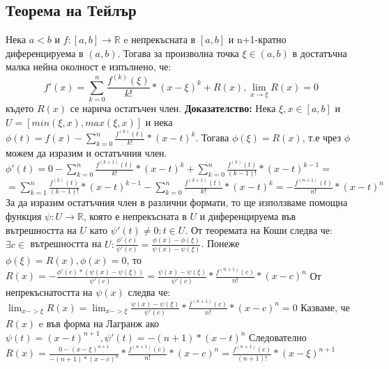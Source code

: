 \documentclass[fleqn,12pt]{article}
\begin{document}
\begin{flushleft}
\subsection{Теорема на Тейлър}
Нека $a<b$ и $f:[a,b]\rightarrow\mathbb{R}$ e непрекъсната в $[a,b]$ и n+1-кратно диференцируема в $(a,b)$. Тогава за произволна точка $\xi \in (a,b)$ в достатъчна малка нейна околност е изпълнено, че:
\[f'(x)=\sum_{k = 0}^{n} \frac{f^{(k)}(\xi)}{k!}*(x-\xi)^k + R(x), \lim_{x \rightarrow \xi} R(x) = 0\]
където $R(x)$ се нарича остатъчен член.
\bigbreak
\textbf{Доказателство:}
Нека $\xi,x \in [a,b]$ и $U=[min(\xi,x),max(\xi,x)]$ и нека $\phi(t) = f(x) - \sum_{k = 0}^{n} \frac{f^{(k)}(t)}{k!}*(x-t)^{k}$.
Тогава $\phi(\xi)=R(x)$, т.е чрез $\phi$ можем да изразим и остатъчния член.
\bigbreak
$\phi'(t)=0 - \sum_{k=0}^{n} \frac{f^{(k+1)}(t)}{k!}*(x-t)^{k} +  \sum_{k=0}^{n}\frac{f^{(k)}(t)}{(k-1)!}*(x-t)^{k-1} =$
$=\sum_{k=1}^{n}\frac{f^{(k)}(t)}{(k-1)!}*(x-t)^{k-1} - \sum_{k=0}^{n} \frac{f^{(k+1)}(t)}{k!}*(x-t)^{k} = -\frac{f^{(n+1)}(t)}{n!}*(x-t)^n$
\bigbreak
За да изразим остатъчния член в различни формати, то ще използваме помощна функция $\psi:U\rightarrow\mathbb{R}$, която е непрекъсната в $U$ и диференцируема във вътрешността на $U$ като $\psi'(t) \neq 0 : t \in U$.
От теоремата на Коши следва че: $\exists c \in$ вътрешността на $U: \frac{\phi'(c)}{\psi'(c)}=\frac{\phi(x)-\phi(\xi)}{\psi(x)-\psi(\xi)}$.
\bigbreak
Понеже $\phi(\xi) = R(x), \phi(x) = 0$, то $R(x) = -\frac{\phi'(c)*(\psi(x)-\psi(\xi))}{\psi'(c)} = \frac{\psi(x)-\psi(\xi)}{\psi'(c)}*\frac{f^{(n+1)}(c)}{n!}*(x-c)^n$\newline
От непрекъснатостта на $\psi(x)$ следва че: $\lim_{x->\xi} R(x) = \lim_{x->\xi} \frac{\psi(x)-\psi(\xi)}{\psi'(c)}*\frac{f^{(n+1)}(c)}{n!}*(x-c)^n = 0$
\bigbreak
Казваме, че $R(x)$ e във форма на Лагранж ако $\psi(t)=(x-t)^{n+1}, \psi'(t)=-(n+1)*(x-t)^n$
Следователно $R(x)=\frac{0-(x-\xi)^{n+1}}{-(n+1)*(x-c)^n}*\frac{f^{(n+1)}(c)}{n!}*(x-c)^n = \frac{f^{(n+1)}(c)}{(n+1)!}*(x-\xi)^{n+1}$


\end{flushleft}
\end{document}
